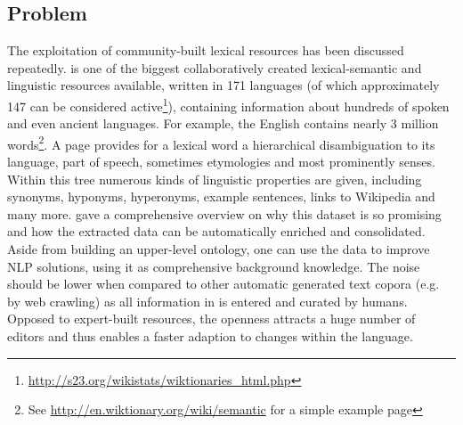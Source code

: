 \subsection{Problem}
\label{intro}
The exploitation of community-built lexical resources has been discussed repeatedly.
\wik is one of the biggest collaboratively created lexical-semantic and linguistic resources available, written in 171 languages (of which approximately 147 can be considered active\footnote{\url{http://s23.org/wikistats/wiktionaries_html.php}}), containing information about hundreds of spoken and even ancient languages. 
For example, the English \wik contains nearly 3 million words\footnote{See \url{http://en.wiktionary.org/wiki/semantic} for a simple example page}.
A \wik page provides for a lexical word a hierarchical disambiguation to its language, part of speech, sometimes etymologies and most prominently senses.
Within this tree numerous kinds of linguistic properties are given, including synonyms, hyponyms, hyperonyms, example sentences, links to Wikipedia and many more.
\cite{meyer_2011b} gave a comprehensive overview on why this dataset is so promising and how the extracted data can be automatically enriched and consolidated. 
Aside from building an upper-level ontology, one can use the data to improve NLP solutions, using it as comprehensive background knowledge.
The noise should be lower when compared to other automatic generated text copora (e.g. by web crawling) as all information in \wik is entered and curated by humans.
Opposed to expert-built resources, the openness attracts a huge number of editors and thus enables a faster adaption to changes within the language.

